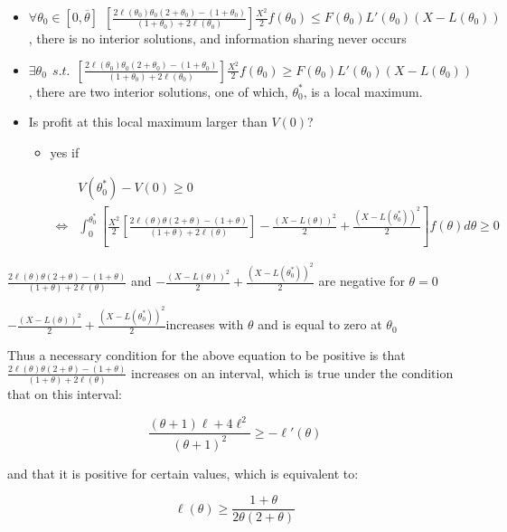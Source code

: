 \documentclass[a4paper]{article}
\renewcommand{\t}{\theta}
\begin{document}
\begin{itemize}
    \item $\forall \t_0\in[0,\overline \t]~~\left[\frac{2\ell(\t_0)\t_0(2+\t_0)-(1+\t_0)}{(1+\t_0)+2\ell(\t_0)}\right]\frac{X^2}{2}f(\t_0)\leq F(\t_0)L'(\t_0)(X-L(\t_0))$, there is no interior solutions, and information sharing never occurs
    \item $\exists \t_0 ~~s.t.~~\left[\frac{2\ell(\t_0)\t_0(2+\t_0)-(1+\t_0)}{(1+\t_0)+2\ell(\t_0)}\right]\frac{X^2}{2}f(\t_0)\geq F(\t_0)L'(\t_0)(X-L(\t_0))$, there are two interior solutions, one of which, $\t_0^*$, is a local maximum.
    \item Is profit at this local maximum larger than $V(0)$?
    \begin{itemize}
        \item yes if 
        
        \begin{align*}
            &V(\t_0^*)-V(0)\geq 0 \\
            \iff&\int_0^{\t_0^*} \left[\frac{X^2}{2}\left[\frac{2\ell(\t)\t(2+\t)-(1+\t)}{(1+\t)+2\ell(\t)}\right]-\frac{(X-L(\t))^2}{2}+\frac{(X-L(\t_0^*))^2}{2}\right]f(\t)d\t\geq 0
        \end{align*} 
    \end{itemize}
\end{itemize}

$\frac{2\ell(\t)\t(2+\t)-(1+\t)}{(1+\t)+2\ell(\t)}$ and $-\frac{(X-L(\t))^2}{2}+\frac{(X-L(\t_0^*))^2}{2}$ are negative for $\t=0$

$-\frac{(X-L(\t))^2}{2}+\frac{(X-L(\t_0^*))^2}{2}$increases with $\t$ and is equal to zero at $\t_0$

Thus a necessary condition for the above equation to be positive is that $\frac{2\ell(\t)\t(2+\t)-(1+\t)}{(1+\t)+2\ell(\t)}$ increases on an interval, which is true under the condition that on this interval:

$$\frac{(\t+1)\ell+4\ell^2}{(\t+1)^2}\geq-\ell'(\t)$$

and that it is positive for certain values, which is equivalent to:

$$\ell(\t)\geq \frac{1+\t}{2\t(2+\t)}$$
%




\end{document}
